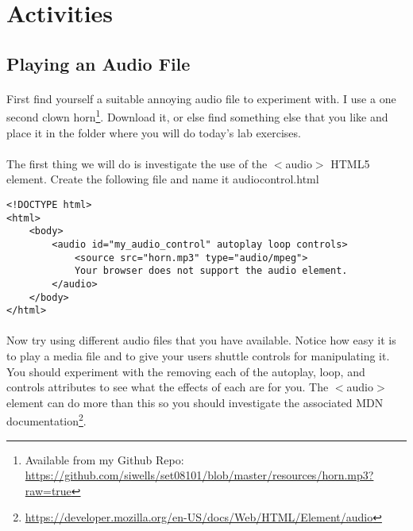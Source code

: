 \documentclass[10pt, a4paper]{article}
\begin{document}


\section{Activities}

\subsection{Playing an Audio File}
\paragraph{} First find yourself a suitable annoying audio file to experiment with. I use a one second clown horn\footnote{Available from my Github Repo: \url{https://github.com/siwells/set08101/blob/master/resources/horn.mp3?raw=true}}. Download it, or else find something else that you like and place it in the folder where you will do today's lab exercises.

\paragraph{} The first thing we will do is investigate the use of the $<$audio$>$ HTML5 element. Create the following file and name it audiocontrol.html

\begin{lstlisting}
<!DOCTYPE html>
<html>
    <body>
        <audio id="my_audio_control" autoplay loop controls>
            <source src="horn.mp3" type="audio/mpeg">
            Your browser does not support the audio element.
        </audio>
    </body>
</html>
\end{lstlisting}

\paragraph{} Now try using different audio files that you have available. Notice how easy it is to play a media file and to give your users shuttle controls for manipulating it. You should experiment with the removing each of the autoplay, loop, and controls attributes to see what the effects of each are for you. The $<$audio$>$ element can do more than this so you should investigate the associated MDN documentation\footnote{\url{https://developer.mozilla.org/en-US/docs/Web/HTML/Element/audio}}.
\end{document}
